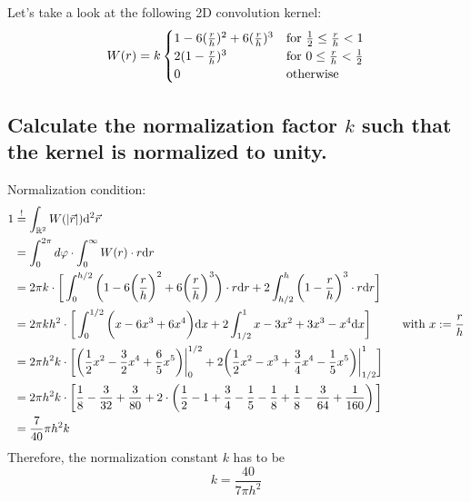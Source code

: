 Let's take a look at the following 2D convolution kernel:
\begin{equation}
    W(r)=k\begin{cases}
        1-6(\frac{r}{h})^2+6(\frac{r}{h})^3 
        & \textnormal{for }\frac{1}{2}\leq\frac{r}{h}<1 \\
        2(1-\frac{r}{h})^3
        & \textnormal{for }0\leq\frac{r}{h}<\frac{1}{2} \\
        0 
        & \textnormal{otherwise} \\
    \end{cases}
\end{equation}

\subsection{Calculate the normalization factor $k$ such that the 
kernel is normalized to unity.}
    Normalization condition:
    \begin{align}
        1
        &\overset{!}{=}\int_{\mathbb{R}^2}W(|\vec r|) \mathrm{d}^2\vec r \\
        &=\int_0^{2\pi}d\varphi\cdot\int_0^\infty W(r)\cdot r \mathrm{d} r \\
        &=2\pi k\cdot\bigg[
            \int_0^{h/2}\bigg(
                1-6\bigg(\frac{r}{h}\bigg)^2+
                6\bigg(\frac{r}{h}\bigg)^3
            \bigg)\cdot r \mathrm{d} r+2\int_{h/2}^h\bigg(1-\frac{r}{h}\bigg)^3\cdot r \mathrm{d} r
        \bigg] \\
        &=2\pi kh^2\cdot\bigg[
            \int_0^{1/2}\bigg(
                x-6x^3+
                6x^4
            \bigg) \mathrm{d} x+2\int_{1/2}^1 x - 3x^2 + 3x^3 - x^4 \mathrm{d} x
        \bigg] \ \ \ \ \ \ \ \ \textnormal{with $x:=\frac{r}{h}$} \\
        &=2\pi h^2k\cdot\bigg[
            \bigg(
                \frac{1}{2}x^2-\frac{3}{2}x^4 + \frac{6}{5}x^5 
            \bigg)\bigg|_0^{1/2}+2\bigg(
                \frac{1}{2}x^2 - x^3 + \frac{3}{4}x^4 - \frac{1}{5}x^5
            \bigg)\bigg|_{1/2}^{1}
        \bigg] \\
        &=2\pi h^2k\cdot\bigg[
            \frac{1}{8} - \frac{3}{32} + \frac{3}{80} + 2 \cdot \left(\frac{1}{2}- 1 + \frac{3}{4} -\frac{1}{5} - \frac{1}{8} + \frac{1}{8} -\frac{3}{64} + \frac{1}{160}\right)  
        \bigg] \\
        &=\frac{7}{40}\pi h^2k
    \end{align}
    Therefore, the normalization constant $k$ has to be
    \begin{equation}
        k=\frac{40}{7\pi h^2}
    \end{equation}
